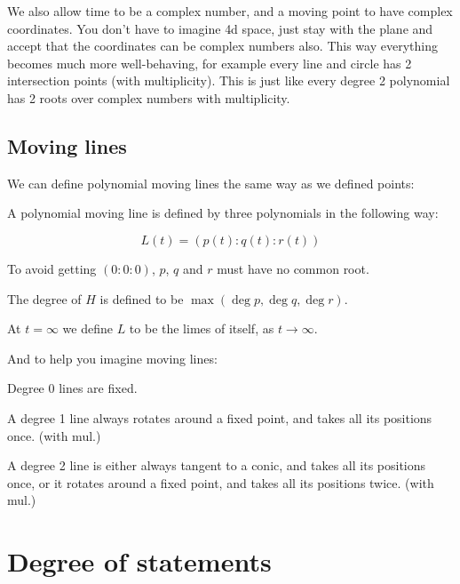 \documentclass[a4paper]{article}
\begin{document}
\begin{remark}
    We also allow time to be a complex number, and a moving point to have complex coordinates. You don't have to imagine 4d space, just stay with the plane and accept that the coordinates can be complex numbers also. This way everything becomes much more well-behaving, for example every line and circle has 2 intersection points (with multiplicity). This is just like every degree 2 polynomial has 2 roots over complex numbers with multiplicity.
\end{remark}

\subsection{Moving lines}

We can define polynomial moving lines the same way as we defined points:

\begin{definition}
A polynomial moving line is defined by three polynomials in the following way:

$$L(t)=(p(t):q(t):r(t))$$

To avoid getting $(0:0:0)$, $p$, $q$ and $r$ must have no common root.

The degree of $H$ is defined to be $\max(\deg p, \deg q, \deg r)$.
\end{definition}

\begin{remark}
    At $t=\infty$ we define $L$ to be the limes of itself, as $t\rightarrow \infty$.
\end{remark}

And to help you imagine moving lines:

\begin{lemma}
\hfill\break
    Degree 0 lines are fixed.

    A degree 1 line always rotates around a fixed point, and takes all its positions once. (with mul.)

    A degree 2 line is either always tangent to a conic, and takes all its positions once, or it rotates around a fixed point, and takes all its positions twice. (with mul.)
\end{lemma}


\section{Degree of statements}
\end{document}
